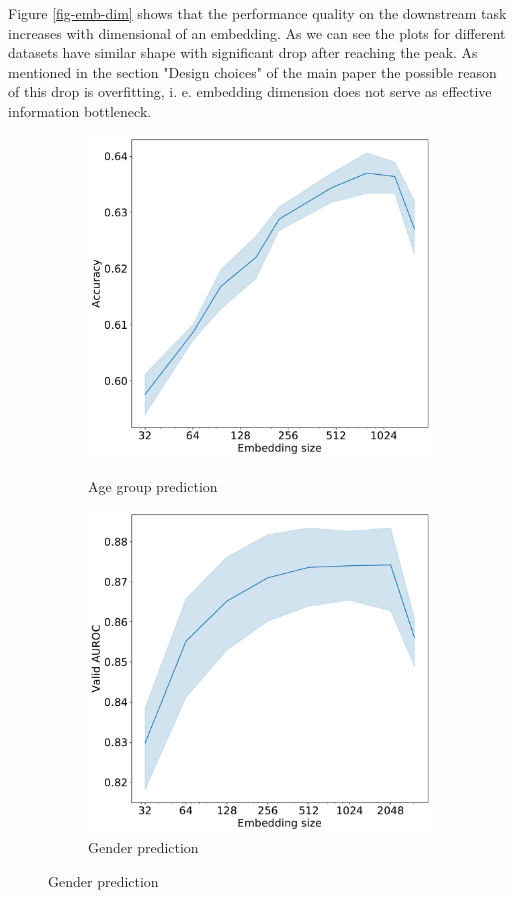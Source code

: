 \documentclass{article}
\begin{document}
Figure \ref{fig-emb-dim} shows that the performance quality on the downstream task increases with dimensional of an embedding. As we can see the plots for different datasets have similar shape with significant drop after reaching the peak. As mentioned in the section "Design choices" of the main paper the possible reason of this drop is overfitting, i. e. embedding dimension does not serve as effective information bottleneck.

\begin{figure}
  \centering
  \caption{Embedding dimensionality vs. quality}
  \begin{subfigure}{0.5\linewidth}
    \caption{Age group prediction}
    \includegraphics[width=\linewidth]{figures/age-pred-hidden-size.pdf}
    \label{fig-emb-dim-age}
  \end{subfigure}%
  \begin{subfigure}{0.5\linewidth}
    \caption{Gender prediction}
    \includegraphics[width=\linewidth]{figures/gender-hidden-size.pdf}

\end{subfigure}
\end{figure}
\end{document}

